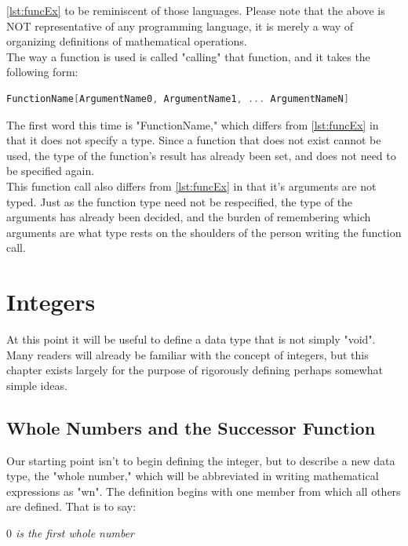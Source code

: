 \ref{lst:funcEx} to be reminiscent of those languages. Please note that the above is NOT representative of any programming language, it is merely a way of organizing definitions of mathematical operations. \\
The way a function is used is called "calling" that function, and it takes the following form:
\begin{center}
\begin{lstlisting}[language=C, caption=Function Call Example, label=lst:funcCallEx]
FunctionName[ArgumentName0, ArgumentName1, ... ArgumentNameN]
\end{lstlisting}
\end{center}
The first word this time is "FunctionName," which differs from \ref{lst:funcEx} in that it does not specify a type. Since a function that does not exist cannot be used, the type of the function's result has already been set, and does not need to be specified again. \\
This function call also differs from \ref{lst:funcEx} in that it's arguments are not typed. Just as the function type need not be respecified, the type of the arguments has already been decided, and the burden of remembering which arguments are what type rests on the shoulders of the person writing the function call.

\section{Integers}
At this point it will be useful to define a data type that is not simply "void". Many readers will already be familiar with the concept of integers, but this chapter exists largely for the purpose of rigorously defining perhaps somewhat simple ideas. \\


\subsection{Whole Numbers and the Successor Function}
Our starting point isn't to begin defining the integer, but to describe a new data type, the "whole number," which will be abbreviated in writing mathematical expressions as "wn". The definition begins with one member from which all others are defined. That is to say:
\begin{center}
\textit{$0$ is the first whole number}
\end{center}

